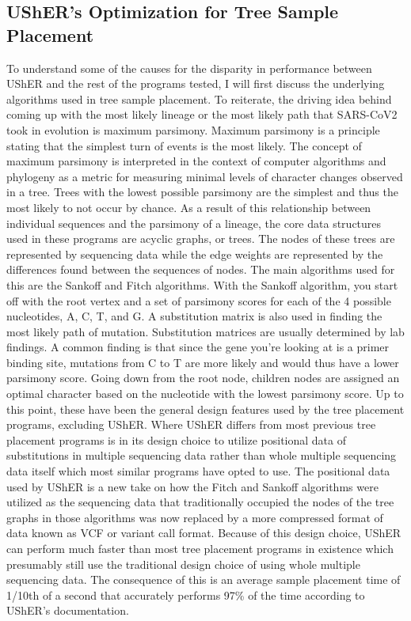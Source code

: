 \documentclass[12pt,journal,compsoc]{IEEEtran}
\begin{document}
\subsection{UShER's Optimization for Tree Sample Placement}
To understand some of the causes for the disparity in performance between UShER and the rest of the programs tested, I will first discuss the underlying algorithms used in tree sample placement. To reiterate, the driving idea behind coming up with the most likely lineage or the most likely path that SARS-CoV2 took in evolution is maximum parsimony. Maximum parsimony is a principle stating that the simplest turn of events is the most likely.  The  concept  of  maximum  parsimony  is  interpreted  in  the  context  of  computer  algorithms and phylogeny as a metric for measuring minimal  levels  of  character  changes  observed  in  a tree. Trees with the lowest possible parsimony are the simplest and thus the most likely to not occur by chance. As a result of this relationship between individual sequences and the parsimony of a lineage, the core data structures used in these programs are acyclic graphs, or trees. The nodes of these trees are represented by sequencing data while the edge weights are represented by the differences found between the sequences of nodes. The main algorithms used for this are the Sankoff and Fitch algorithms. With the Sankoff algorithm, you start off with the root vertex and a set of parsimony scores for each of the 4 possible nucleotides, A, C, T, and G. A substitution matrix is also used in finding the most likely path of mutation. Substitution matrices are usually determined by lab findings. A common finding is that since the gene you’re looking at is a primer binding site, mutations from C to T are more likely and would thus have a lower parsimony score. Going down from the root node, children nodes are assigned an optimal character based on the nucleotide with the lowest parsimony score. Up to this point, these have been the general design features used by the tree placement programs, excluding UShER.  Where UShER differs from most previous tree placement programs is in its design choice to utilize positional data of substitutions in multiple sequencing data rather than whole multiple sequencing data itself which most similar programs have opted to use. The positional data used by UShER is a new take on how the Fitch and Sankoff algorithms were utilized as the sequencing data that traditionally occupied the nodes of the tree graphs in those algorithms was now replaced by a more compressed format of data known as VCF or variant call format. Because of this design choice, UShER can perform much faster than most tree placement programs in existence which presumably still use the traditional design choice of using whole multiple sequencing data. The consequence of this is an average sample placement time of 1/10th of a second that accurately performs 97\% of the time according to UShER’s documentation. 
\end{document}
